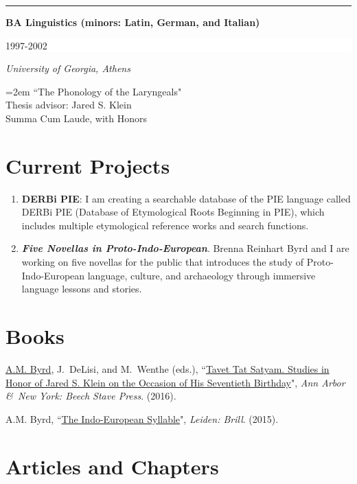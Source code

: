 \documentclass[paper=letter,fontsize=11pt]{scrartcl}
\newcommand{\EducationEntry}[4]{
		\noindent \textbf{#1} \hfill      
		\colorbox{White}{
			\parbox{6em}{
			\hfill\color{Black}#2}} \par  
		\noindent \textit{#3} \par        
		\noindent\hangindent=2em\hangafter=0 \small #4 
		\normalsize \par}
\newcommand{\BookEntry}[4]{
		\noindent #1, ``\href{#3}{#4}", \textit{#3}.}
\begin{document}
\noindent\rule{8cm}{0.2pt}

\EducationEntry{BA Linguistics (minors: Latin, German, and Italian)}{1997-2002}{University of Georgia, Athens}
{``The Phonology of the Laryngeals"\\
Thesis advisor: Jared S. Klein\\
Summa Cum Laude, with Honors}

\section*{Current Projects}

\begin{enumerate}
\item{{\textbf{DERBi PIE}}: I am creating a searchable database of the PIE language called DERBi PIE (Database of Etymological Roots Beginning in PIE), which includes multiple etymological reference works and search functions.}

\item{{\textit{\textbf{Five Novellas in Proto-Indo-European}}}}. Brenna Reinhart Byrd and I are working on five novellas for the public that introduces the study of Proto-Indo-European language, culture, and archaeology through immersive language lessons and stories.

\end{enumerate}

\section*{Books}

\begin{etaremune}
\item \BookEntry{\underline{A.M. Byrd}, J.~DeLisi, and M.~Wenthe (eds.)}{http://www.beechstave.com/tavet.htm}
{Ann Arbor \&~New York: Beech Stave Press} {Tavet Tat Satyam. Studies in Honor of Jared S. Klein on the Occasion of His Seventieth Birthday}{ (2016).}
\item \BookEntry{A.M. Byrd}{http://www.beechstave.com/tavet.htm}{Leiden: Brill}{The Indo-European Syllable}{ (2015).}
\end{etaremune}

\section*{Articles and Chapters}
\end{document}
